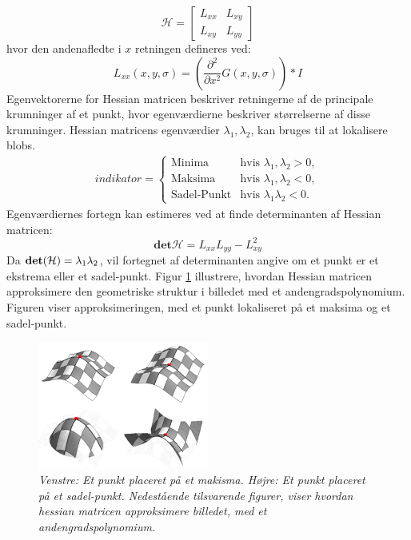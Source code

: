 \begin{equation}
\mathcal{H} = 
 \begin{bmatrix}
 	L_{xx} & L_{xy} \\
 	L_{xy} & L_{yy}
 \end{bmatrix}
 \label{hessianmatrixblob}
\end{equation}
hvor den andenafledte i $x$ retningen defineres ved:
\begin{equation}
L_{xx}(x,y,\sigma) = (\frac{\partial^2 }{\partial x^2 } G(x,y,\sigma)) * I
\label{lxx}
\end{equation}
Egenvektorerne for Hessian matricen beskriver retningerne af de principale krumninger af et punkt, hvor egenværdierne beskriver størrelserne af disse krumninger. Hessian matricens egenværdier $\lambda_1,\lambda_2$, kan bruges til at lokalisere blobs.
\begin{equation}
\begin{split}
indikator = 
\begin{cases}
\text{Minima} & \text{hvis } \lambda_1, \lambda_2 > 0, \\
\text{Maksima}& \text{hvis } \lambda_1, \lambda_2 < 0,  \\
\text{Sadel-Punkt} & \text{hvis } \lambda_1 \lambda_2 < 0.
\end{cases}
\end{split}
\label{maxsurp}
\end{equation}
Egenværdiernes fortegn kan estimeres ved  at finde determinanten af Hessian matricen:
\begin{equation}
\textbf{det}\mathcal{H} = L_{xx}L_{yy}-L_{xy}^2
\label{detofhessian}
\end{equation}
Da $\bold{det}(\mathcal{H})=\lambda_1 \lambda_2$, vil fortegnet af determinanten angive om et punkt er et ekstrema eller et sadel-punkt. Figur \ref{fig:makssad} illustrere, hvordan Hessian matricen approksimere den geometriske struktur i billedet med et andengradspolynomium. Figuren viser approksimeringen, med et punkt lokaliseret på et maksima og et sadel-punkt.
\begin{figure}[H]
    \centering
    \includegraphics[width=0.50\textwidth]{fig/41.png}
    \vspace{-0.5em}
    \begin{center}
    \caption{{\footnotesize \textit{Venstre: Et punkt placeret på et makisma. Højre: Et punkt placeret på et sadel-punkt. Nedestående tilsvarende figurer, viser hvordan hessian matricen approksimere billedet, med et andengradspolynomium. 
}}}
    \label{fig:makssad}
     \end{center}
  \end{figure}
